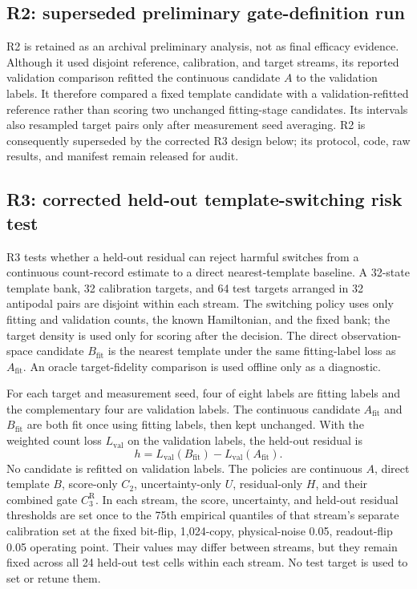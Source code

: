 \documentclass[11pt]{article}
\numberwithin{equation}{section}
\begin{document}
\subsection{R2: superseded preliminary gate-definition run}

R2 is retained as an archival preliminary analysis, not as final efficacy
evidence.  Although it used disjoint reference, calibration, and target streams,
its reported validation comparison refitted the continuous candidate $A$ to the
validation labels.  It therefore compared a fixed template candidate with a
validation-refitted reference rather than scoring two unchanged fitting-stage
candidates.  Its intervals also resampled target pairs only after measurement
seed averaging.  R2 is consequently superseded by the corrected R3 design below;
its protocol, code, raw results, and manifest remain released for audit.

\subsection{R3: corrected held-out template-switching risk test}

R3 tests whether a held-out residual can reject harmful switches from a
continuous count-record estimate to a direct nearest-template baseline.  A
32-state template bank, 32 calibration targets, and 64 test targets arranged in
32 antipodal pairs are disjoint within each stream.  The switching policy uses
only fitting and validation counts, the known Hamiltonian, and the fixed bank;
the target density is used only for scoring after the decision.  The direct
observation-space candidate $B_{\mathrm{fit}}$ is the nearest template under the
same fitting-label loss as $A_{\mathrm{fit}}$.  An oracle target-fidelity
comparison is used offline only as a diagnostic.

For each target and measurement seed, four of eight labels are fitting labels and
the complementary four are validation labels.  The continuous candidate
$A_{\mathrm{fit}}$ and $B_{\mathrm{fit}}$ are both fit once using fitting labels,
then kept unchanged.  With the weighted count loss $L_{\mathrm{val}}$ on the
validation labels, the held-out residual is
\begin{equation}
h=L_{\mathrm{val}}(B_{\mathrm{fit}})-L_{\mathrm{val}}(A_{\mathrm{fit}}).
\label{eq:r3-heldout-residual}
\end{equation}
No candidate is refitted on validation labels.  The policies are continuous $A$,
direct template $B$, score-only $C_2$, uncertainty-only $U$, residual-only $H$,
and their combined gate $C_3^{\mathrm R}$.  In each stream, the score,
uncertainty, and held-out residual thresholds are set once to the 75th empirical
quantiles of that stream's separate calibration set at the fixed bit-flip,
1,024-copy, physical-noise 0.05, readout-flip 0.05 operating point.  Their
values may differ between streams, but they remain fixed across all 24 held-out
test cells within each stream.  No test target is used to set or retune them.
\end{document}
